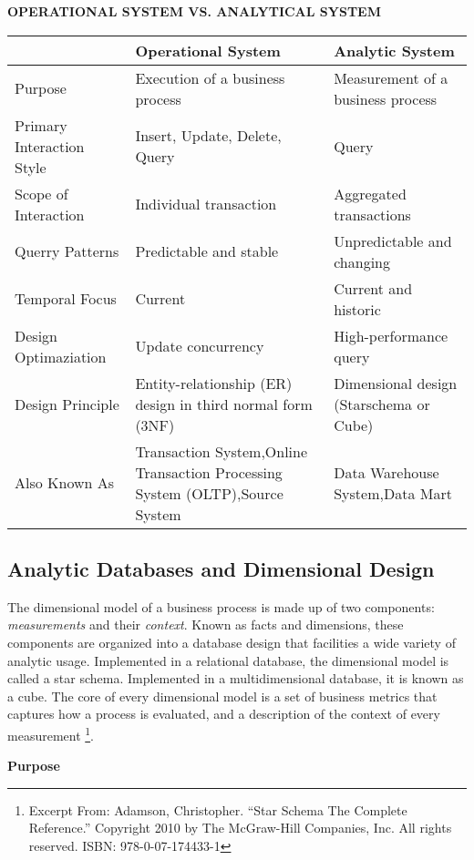 \documentclass[letterpaper,12pt,oneside]{sphinxmanual}
\begin{document}
\textbf{OPERATIONAL SYSTEM VS. ANALYTICAL SYSTEM}

\begin{tabulary}{\linewidth}{|L|L|L|}
\hline
 & 
Operational System
 & 
Analytic System
\\
\hline
Purpose
 & 
Execution of a business process
 & 
Measurement of a business process
\\
\hline
Primary Interaction Style
 & 
Insert, Update, Delete, Query
 & 
Query
\\
\hline
Scope of Interaction
 & 
Individual transaction
 & 
Aggregated transactions
\\
\hline
Querry Patterns
 & 
Predictable and stable
 & 
Unpredictable and changing
\\
\hline
Temporal Focus
 & 
Current
 & 
Current and historic
\\
\hline
Design Optimaziation
 & 
Update concurrency
 & 
High-performance query
\\
\hline
Design Principle
 & 
Entity-relationship (ER) design in third normal form (3NF)
 & 
Dimensional design
(Starschema or Cube)
\\
\hline
Also Known As
 & 
Transaction System,Online Transaction Processing System (OLTP),Source System
 & 
Data Warehouse System,Data Mart
\\
\hline\end{tabulary}



\subsection{Analytic Databases and Dimensional Design}
\label{introduction:analytic-databases-and-dimensional-design}
The dimensional model of a business process is made up of two components: \emph{measurements} and their \emph{context}.
Known as facts and dimensions, these components are organized into a database design that
facilities a wide variety of analytic usage. Implemented in a relational database, the dimensional
model is called a star schema. Implemented in a multidimensional database, it is known as a cube.
The core of every dimensional model is a set of business metrics that captures how a process is evaluated,
and a description of the context of every measurement \footnote[6]{\sphinxAtStartFootnote%
Excerpt From: Adamson, Christopher. “Star Schema The Complete Reference.” Copyright 2010 by The McGraw-Hill Companies, Inc. All rights reserved. ISBN: 978-0-07-174433-1
}.

\textbf{Purpose}
\end{document}
